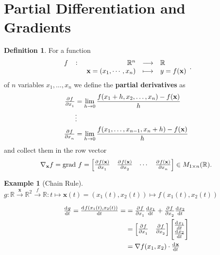 \documentclass[12pt,openany]{book}
\theoremstyle{definition}
\newtheorem{definition}{Definition}[chapter]
\newtheorem{example}{Example}[chapter]
\newcommand{\R}{\mathbb{R}}
\newcommand{\of}[1]{\left( #1 \right)}
\newcommand{\by}{\times}
\renewcommand{\vec}[1]{\textbf{#1}}
\begin{document}
\section{Partial Differentiation and Gradients}
\begin{tcolorbox}[colframe=defcolor,title={\color{white}\bf Partial Derivative}]
	\begin{definition}
		For a function\[
		\fullfunction{f}{\R^n}{\R}{\vec{x}=(x_1,\cdots, x_n)}{y=f(\vec{x})}.
		\] of $n$ variables $x_1,\dots,x_n$ we define the \textbf{partial derivatives} as 
		\begin{align*}
			\pd{f}{x_1}&=\lim\limits_{h\to 0}\frac{f(x_1+h,x_2,\dots, x_n)-f(\vec{x})}{h}\\
			&\vdots\\
			\pd{f}{x_n}&=\lim\limits_{h\to 0}\frac{f(x_1,\dots,x_{n-1}, x_n+h)-f(\vec{x})}{h}
		\end{align*} and collect them in the row vector
		\[
		\nabla_{\vec{x}}f=\textnormal{grad}\ f=\begin{bmatrix}
			\pd{f(\vec{x})}{x_1} & \pd{f(\vec{x})}{x_2} & \cdots & \pd{f(\vec{x})}{x_n}
		\end{bmatrix}\in M_{1\by n}(\R).
		\]
	\end{definition}
\end{tcolorbox}
\begin{example}[Chain Rule]
	$g:\R\xrightarrow{\vec{x}}\R^2\xrightarrow{f}\R:t\mapsto\vec{x}(t)=\of{x_1(t),x_2(t)}\mapsto f(x_1(t),x_2(t))$
	\begin{figure}[h!]\centering
	\end{figure}
	\begin{align*}
		\od{g}{t}=\od{f(x_1(t),x_2(t))}{t}=&=\pd{f}{x_1}\od{x_1}{t}+\pd{f}{x_2}\od{x_2}{t}\\
		&=\begin{bmatrix}
			\pd{f}{x_1} & \pd{f}{x_2}
		\end{bmatrix}\begin{bmatrix}
			\od{x_1}{t}\\ \od{x_2}{t}
		\end{bmatrix}\\
		&=\nabla f(x_1,x_2)\cdot\od{\vec{x}}{t}
	\end{align*}
\end{example}
\end{document}
